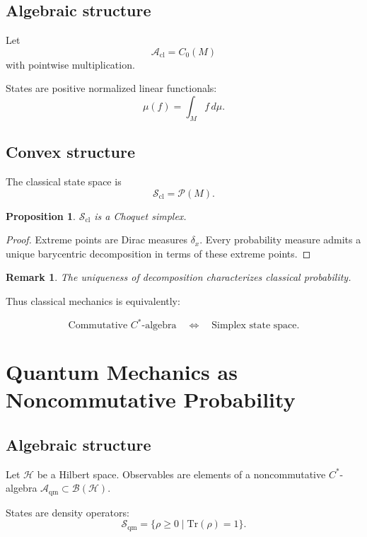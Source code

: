 \documentclass[11pt]{article}
\newtheorem{proposition}{Proposition}
\newtheorem{remark}{Remark}
\begin{document}
\subsection{Algebraic structure}

Let
\[
\mathcal{A}_{\mathrm{cl}} = C_0(M)
\]
with pointwise multiplication.

States are positive normalized linear functionals:
\[
\mu(f) = \int_M f\, d\mu.
\]

\subsection{Convex structure}

The classical state space is
\[
\mathcal{S}_{\mathrm{cl}} = \mathcal{P}(M).
\]

\begin{proposition}
$\mathcal{S}_{\mathrm{cl}}$ is a Choquet simplex.
\end{proposition}

\begin{proof}
Extreme points are Dirac measures $\delta_x$.
Every probability measure admits a unique barycentric decomposition
in terms of these extreme points.
\end{proof}

\begin{remark}
The uniqueness of decomposition characterizes classical probability.
\end{remark}

Thus classical mechanics is equivalently:

\[
\text{Commutative } C^*\text{-algebra}
\quad \Longleftrightarrow \quad
\text{Simplex state space}.
\]

\section{Quantum Mechanics as Noncommutative Probability}

\subsection{Algebraic structure}

Let $\mathcal{H}$ be a Hilbert space.
Observables are elements of a noncommutative $C^*$-algebra
$\mathcal{A}_{\mathrm{qm}} \subset \mathcal{B}(\mathcal{H})$.

States are density operators:
\[
\mathcal{S}_{\mathrm{qm}} =
\{ \rho \ge 0 \mid \mathrm{Tr}(\rho)=1 \}.
\]
\end{document}
